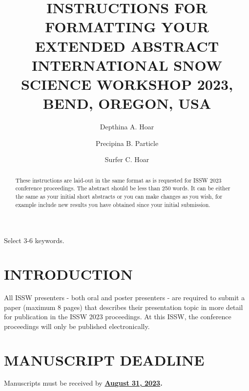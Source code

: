 \documentclass[3p,authoryear,times,twocolumn]{elsarticle_issw2018}
\begin{document}
\begin{frontmatter}

\title{INSTRUCTIONS FOR FORMATTING YOUR EXTENDED ABSTRACT\\INTERNATIONAL SNOW SCIENCE WORKSHOP 2023, BEND, OREGON, USA}

\author[1]{Depthina A. Hoar}
\author[2]{Precipina B. Particle}
\author[3]{Surfer C. Hoar}

\address[1]{Institute of Hoarticulture, Walla Walla, WA, USA}
\address[2]{Avalanche Forecasting Centre, Skookumchuk, BC, Canada}
\address[3]{Highway Safety Office, Brunico, Italy}

\begin{abstract}
\noindent
These instructions are laid-out in the same format as is requested for ISSW 2023 conference proceedings. The abstract should be less than 250 words. It can be either the same as your initial short abstracts or you can make changes as you wish, for example include new results you have obtained since your initial submission.
\end{abstract}

\begin{keyword}
Select 3-6 keywords.
\end{keyword}

\end{frontmatter}

\section{INTRODUCTION}
All ISSW presenters - both oral and poster presenters - are required to submit a paper (maximum 8 pages) that describes their presentation topic in more detail for publication in the ISSW 2023 proceedings. At this ISSW, the conference proceedings will only be published electronically.
%
\section{MANUSCRIPT DEADLINE}
Manuscripts must be received by \textbf{\underline{August 31, 2023}.}\\
\end{document}
